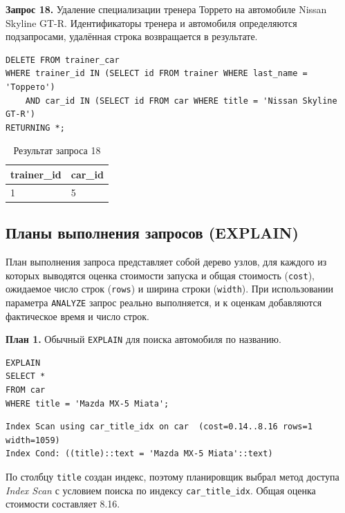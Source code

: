 \documentclass[oneside,a4paper,14pt]{extarticle}
\begin{document}
\textbf{Запрос 18.} Удаление специализации тренера Торрето на автомобиле Nissan Skyline GT-R. Идентификаторы тренера и автомобиля определяются подзапросами, удалённая строка возвращается в результате.

\begin{verbatim}
DELETE FROM trainer_car
WHERE trainer_id IN (SELECT id FROM trainer WHERE last_name = 'Торрето')
    AND car_id IN (SELECT id FROM car WHERE title = 'Nissan Skyline GT-R')
RETURNING *;
\end{verbatim}

\begin{table}[H]
\centering
\footnotesize

\caption{Результат запроса 18}\label{tab:ret3}
\begin{tabular}{|l|l|}
\hline
\textbf{trainer\_\allowbreak id} & \textbf{car\_\allowbreak id} \\ \hline
1 & 5 \\ \hline
\end{tabular}
\end{table}


\subsection{Планы выполнения запросов (EXPLAIN)}

План выполнения запроса представляет собой дерево узлов, для каждого из которых выводятся оценка стоимости запуска и общая стоимость (\texttt{cost}), ожидаемое число строк (\texttt{rows}) и ширина строки (\texttt{width}). При использовании параметра \texttt{ANALYZE} запрос реально выполняется, и к оценкам добавляются фактическое время и число строк.

\textbf{План 1.} Обычный \texttt{EXPLAIN} для поиска автомобиля по названию.

\begin{verbatim}
EXPLAIN
SELECT *
FROM car
WHERE title = 'Mazda MX-5 Miata';
\end{verbatim}

\begin{Verbatim}[fontsize=\scriptsize,breaklines=true,breakanywhere=true]
Index Scan using car_title_idx on car  (cost=0.14..8.16 rows=1 width=1059)
Index Cond: ((title)::text = 'Mazda MX-5 Miata'::text)
\end{Verbatim}


По столбцу \texttt{title} создан индекс, поэтому планировщик выбрал метод доступа \textit{Index Scan} с условием поиска по индексу \texttt{car\_title\_idx}. Общая оценка стоимости составляет 8.16.
\end{document}
